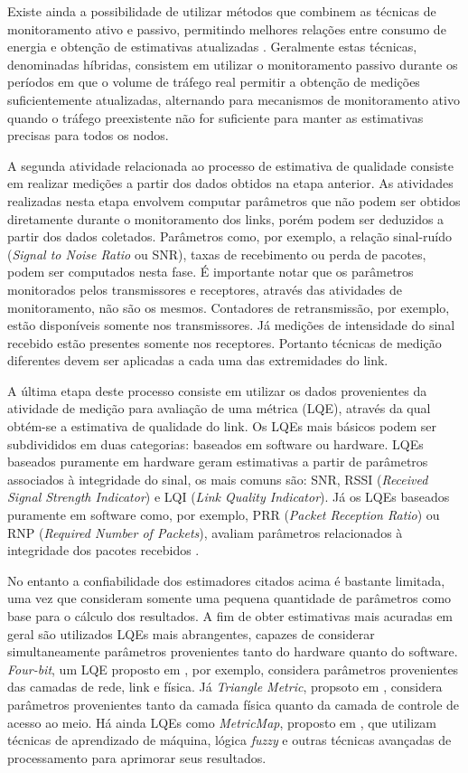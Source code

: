 \documentclass[
	12pt,				%
	openright,			%
	oneside,
	a4paper,			%
	english,			%
	french,				%
	spanish,			%
	brazil				%
	]{abntex2}
\begin{document}
Existe ainda a possibilidade de utilizar métodos que combinem as técnicas de monitoramento ativo e passivo, permitindo melhores relações entre consumo de energia e obtenção de estimativas atualizadas \cite{Gnawali2009,Kim2006}. Geralmente estas técnicas, denominadas híbridas, consistem em utilizar o monitoramento passivo durante os períodos em que o volume de tráfego real permitir a obtenção de medições suficientemente atualizadas, alternando para mecanismos de monitoramento ativo quando o tráfego preexistente não for suficiente para manter as estimativas precisas para todos os nodos.

A segunda atividade relacionada ao processo de estimativa de qualidade consiste em realizar medições a partir dos dados obtidos na etapa anterior. As atividades realizadas nesta etapa envolvem computar parâmetros que não podem ser obtidos diretamente durante o monitoramento dos links, porém podem ser deduzidos a partir dos dados coletados. Parâmetros como, por exemplo, a relação sinal-ruído (\textit{Signal to Noise Ratio} ou SNR), taxas de recebimento ou perda de pacotes, podem ser computados nesta fase. É importante notar que os parâmetros monitorados pelos transmissores e receptores, através das atividades de monitoramento, não são os mesmos. Contadores de retransmissão, por exemplo, estão disponíveis somente nos transmissores. Já medições de intensidade do sinal recebido estão presentes somente nos receptores. Portanto técnicas de medição diferentes devem ser aplicadas a cada uma das extremidades do link.

A última etapa deste processo consiste em utilizar os dados provenientes da atividade de medição para avaliação de uma métrica (LQE), através da qual obtém-se a estimativa de qualidade do link. Os LQEs mais básicos podem ser subdivididos em duas categorias: baseados em software ou hardware. LQEs baseados puramente em hardware geram estimativas a partir de parâmetros associados à integridade do sinal, os mais comuns são: SNR, RSSI (\textit{Received Signal Strength Indicator}) e LQI (\textit{Link Quality Indicator}). Já os LQEs baseados puramente em software como, por exemplo, PRR (\textit{Packet Reception Ratio}) ou RNP (\textit{Required Number of Packets}), avaliam parâmetros relacionados à integridade dos pacotes recebidos \cite{Baccour2012}.

No entanto a confiabilidade dos estimadores citados acima é bastante limitada, uma vez que consideram somente uma pequena quantidade de parâmetros como base para o cálculo dos resultados. A fim de obter estimativas mais acuradas em geral são utilizados LQEs mais abrangentes, capazes de considerar simultaneamente parâmetros provenientes tanto do hardware quanto do software. \textit{Four-bit}, um LQE proposto em , por exemplo, considera parâmetros provenientes das camadas de rede, link e física. Já \textit{Triangle Metric}, propsoto em , considera parâmetros provenientes tanto da camada física quanto da camada de controle de acesso ao meio. Há ainda LQEs como \textit{MetricMap}, proposto em , que utilizam técnicas de aprendizado de máquina, lógica \textit{fuzzy} e outras técnicas avançadas de processamento para aprimorar seus resultados.
\end{document}

